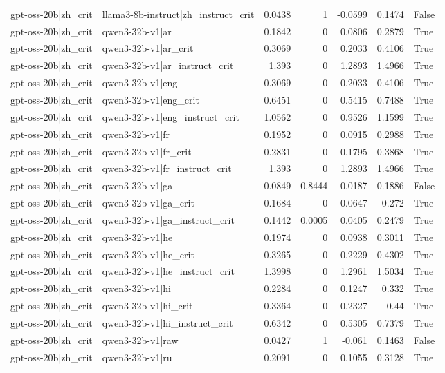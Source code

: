 \begin{table}
\begin{tabular}{l l r r r r l}
gpt-oss-20b|zh_crit & llama3-8b-instruct|zh_instruct_crit & 0.0438 & 1 & -0.0599 & 0.1474 & False \\
gpt-oss-20b|zh_crit & qwen3-32b-v1|ar & 0.1842 & 0 & 0.0806 & 0.2879 & True \\
gpt-oss-20b|zh_crit & qwen3-32b-v1|ar_crit & 0.3069 & 0 & 0.2033 & 0.4106 & True \\
gpt-oss-20b|zh_crit & qwen3-32b-v1|ar_instruct_crit & 1.393 & 0 & 1.2893 & 1.4966 & True \\
gpt-oss-20b|zh_crit & qwen3-32b-v1|eng & 0.3069 & 0 & 0.2033 & 0.4106 & True \\
gpt-oss-20b|zh_crit & qwen3-32b-v1|eng_crit & 0.6451 & 0 & 0.5415 & 0.7488 & True \\
gpt-oss-20b|zh_crit & qwen3-32b-v1|eng_instruct_crit & 1.0562 & 0 & 0.9526 & 1.1599 & True \\
gpt-oss-20b|zh_crit & qwen3-32b-v1|fr & 0.1952 & 0 & 0.0915 & 0.2988 & True \\
gpt-oss-20b|zh_crit & qwen3-32b-v1|fr_crit & 0.2831 & 0 & 0.1795 & 0.3868 & True \\
gpt-oss-20b|zh_crit & qwen3-32b-v1|fr_instruct_crit & 1.393 & 0 & 1.2893 & 1.4966 & True \\
gpt-oss-20b|zh_crit & qwen3-32b-v1|ga & 0.0849 & 0.8444 & -0.0187 & 0.1886 & False \\
gpt-oss-20b|zh_crit & qwen3-32b-v1|ga_crit & 0.1684 & 0 & 0.0647 & 0.272 & True \\
gpt-oss-20b|zh_crit & qwen3-32b-v1|ga_instruct_crit & 0.1442 & 0.0005 & 0.0405 & 0.2479 & True \\
gpt-oss-20b|zh_crit & qwen3-32b-v1|he & 0.1974 & 0 & 0.0938 & 0.3011 & True \\
gpt-oss-20b|zh_crit & qwen3-32b-v1|he_crit & 0.3265 & 0 & 0.2229 & 0.4302 & True \\
gpt-oss-20b|zh_crit & qwen3-32b-v1|he_instruct_crit & 1.3998 & 0 & 1.2961 & 1.5034 & True \\
gpt-oss-20b|zh_crit & qwen3-32b-v1|hi & 0.2284 & 0 & 0.1247 & 0.332 & True \\
gpt-oss-20b|zh_crit & qwen3-32b-v1|hi_crit & 0.3364 & 0 & 0.2327 & 0.44 & True \\
gpt-oss-20b|zh_crit & qwen3-32b-v1|hi_instruct_crit & 0.6342 & 0 & 0.5305 & 0.7379 & True \\
gpt-oss-20b|zh_crit & qwen3-32b-v1|raw & 0.0427 & 1 & -0.061 & 0.1463 & False \\
gpt-oss-20b|zh_crit & qwen3-32b-v1|ru & 0.2091 & 0 & 0.1055 & 0.3128 & True \\

\end{tabular}
\end{table}
